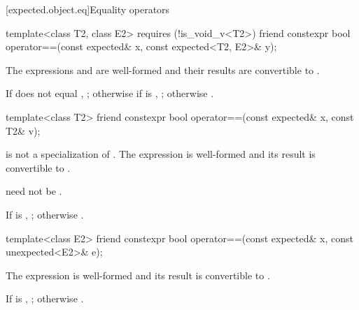 [expected.object.eq]{Equality operators}

%
\begin{itemdecl}
template<class T2, class E2> requires (!is_void_v<T2>)
  friend constexpr bool operator==(const expected& x, const expected<T2, E2>& y);
\end{itemdecl}

\begin{itemdescr}
\pnum
\constraints
The expressions  and 
are well-formed and their results are convertible to .

\pnum
\returns
If  does not equal , ;
otherwise if  is , ;
otherwise .
\end{itemdescr}

%
\begin{itemdecl}
template<class T2> friend constexpr bool operator==(const expected& x, const T2& v);
\end{itemdecl}

\begin{itemdescr}
\pnum
\constraints
{} is not a specialization of .
The expression  is well-formed and
its result is convertible to .
\begin{note}
 need not be .
\end{note}

\pnum
\returns
If  is ,
;
otherwise .
\end{itemdescr}

%
\begin{itemdecl}
template<class E2> friend constexpr bool operator==(const expected& x, const unexpected<E2>& e);
\end{itemdecl}

\begin{itemdescr}
\pnum
\constraints
The expression  is well-formed and
its result is convertible to .

\pnum
\returns
If  is ,
;
otherwise .
\end{itemdescr}

